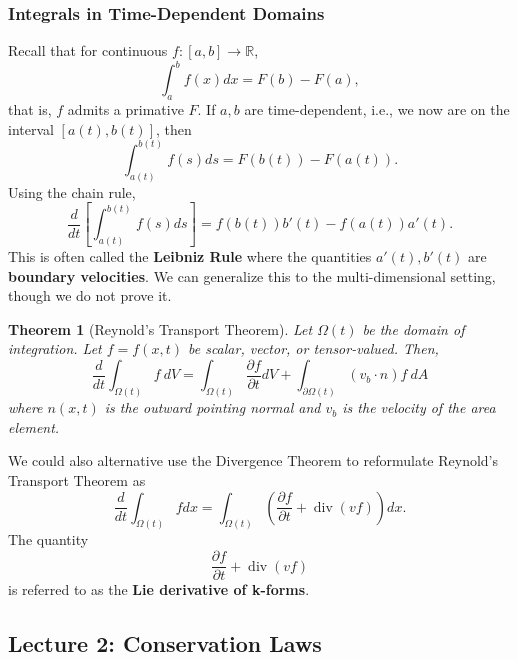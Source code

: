 \documentclass{article}
\newtheorem{theorem}{Theorem}[subsection] %
\theoremstyle{definition}
\theoremstyle{definition}
\newcommand{\R}{\mathbb{R}}
\begin{document}
\subsubsection{Integrals in Time-Dependent Domains}
Recall that for continuous $f:[a,b]\to \R$,
$$\int_{a}^{b}f(x)dx=F(b)-F(a),$$
that is, $f$ admits a primative $F$. If $a,b$ are time-dependent, i.e., we now are on the interval $[a(t),b(t)]$, then
$$\int_{a(t)}^{b(t)}f(s)ds=F(b(t))-F(a(t)).$$
Using the chain rule,
$$\frac{d}{dt}\left[\int_{a(t)}^{b(t)}f(s)ds\right]=f(b(t))b'(t)-f(a(t))a'(t).$$
This is often called the \textbf{Leibniz Rule} where the quantities $a'(t),b'(t)$ are \textbf{boundary velocities}. We can generalize this to the multi-dimensional setting, though we do not prove it.
\begin{theorem}[Reynold's Transport Theorem]
    Let $\Omega(t)$ be the domain of integration. Let $f=f(x,t)$ be scalar, vector, or tensor-valued. Then,
    $$\frac{d}{dt}\int_{\Omega(t)}f\:dV=\int_{\Omega(t)}\frac{\partial f}{\partial t}dV+\int_{\partial \Omega(t)}(v_b\cdot n)f\:dA$$
    where $n(x,t)$ is the outward pointing normal and $v_b$ is the velocity of the area element.
\end{theorem}
We could also alternative use the Divergence Theorem to reformulate Reynold's Transport Theorem as
$$\frac{d}{dt}\int_{\Omega(t)}fdx=\int_{\Omega(t)}(\frac{\partial f}{\partial t}+\operatorname{div}(vf))dx.$$
The quantity
$$\frac{\partial f}{\partial t}+\operatorname{div}(vf)$$
is referred to as the \textbf{Lie derivative of k-forms}.

\subsection{Lecture 2: Conservation Laws}
\end{document}
